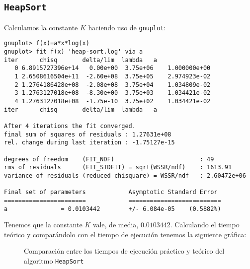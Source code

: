 \pagebreak

\subsection{\texttt{HeapSort}}\label{eficiencia-oculta-heapsort}

Calculamos la constante $K$ haciendo uso de \texttt{gnuplot}:

\begin{lstlisting}
gnuplot> f(x)=a*x*log(x)
gnuplot> fit f(x) 'heap-sort.log' via a
iter      chisq       delta/lim  lambda   a
   0 6.8915727396e+14   0.00e+00  3.75e+06    1.000000e+00
   1 2.6508616504e+11  -2.60e+08  3.75e+05    2.974923e-02
   2 1.2764186428e+08  -2.08e+08  3.75e+04    1.034809e-02
   3 1.2763127018e+08  -8.30e+00  3.75e+03    1.034421e-02
   4 1.2763127018e+08  -1.75e-10  3.75e+02    1.034421e-02
iter      chisq       delta/lim  lambda   a

After 4 iterations the fit converged.
final sum of squares of residuals : 1.27631e+08
rel. change during last iteration : -1.75127e-15

degrees of freedom    (FIT_NDF)                        : 49
rms of residuals      (FIT_STDFIT) = sqrt(WSSR/ndf)    : 1613.91
variance of residuals (reduced chisquare) = WSSR/ndf   : 2.60472e+06

Final set of parameters            Asymptotic Standard Error
=======================            ==========================
a               = 0.0103442        +/- 6.084e-05    (0.5882%)
\end{lstlisting}

Tenemos que la constante $K$ vale, de media, $0.0103442$.
Calculando el tiempo teórico y comparándolo con el tiempo de ejecución tenemos la siguiente gráfica:

\begin{figure}[h]
\begin{center}
\end{center}
\caption{Comparación entre los tiempos de ejecución práctico y teórico del algoritmo \texttt{HeapSort}}
\end{figure}
